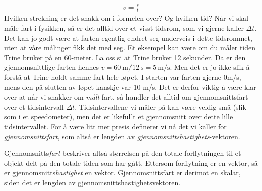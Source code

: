 \begin{align}
    v=\frac{s}{t}
\end{align}
Hvilken strekning er det snakk om i formelen over? Og hvilken tid? Når vi skal måle fart i fysikken, så er det alltid over et visst tidsrom, som vi gjerne kaller $\Delta t$. Det kan jo godt være at farten egentlig endret seg underveis i dette tidsrommet, uten at våre målinger fikk det med seg. Et eksempel kan være om du måler tiden Trine bruker på en 60-meter. La oss si at Trine bruker 12 sekunder. Da er den gjennomsnittlige farten hennes $\bar{v}=\SI{60}{\metre}/\SI{12}{\second}=\SI{5}{\metre\per\second}.$ Men det er jo ikke slik å forstå at Trine holdt samme fart hele løpet. I starten var farten gjerne 0m/s, mens den på slutten av løpet kanskje var 10 m/s. Det er derfor viktig å være klar over at når vi snakker om \textit{målt} fart, så handler det alltid om gjennomsnittsfart over et tidsintervall $\Delta t$. Tidsintervallene vi måler på kan være veldig små (slik som i et speedometer), men det er likefullt et gjennomsnitt over dette lille tidsintervallet. For å være litt mer presis definerer vi nå det vi kaller for \textit{gjennomsnittsfart}, som altså er lengden av \textit{gjennomsnittshastighets}-vektoren.

Gjennomsnitts\textit{fart} beskriver altså størrelsen på den totale forflytningen til et objekt delt på den totale tiden som har gått. Ettersom forflytning er en vektor, så er gjennomsnitts\textit{hastighet} en vektor. Gjennomsnittsfart er derimot en skalar, siden det er lengden av gjennomsnittshastighetsvektoren. 


